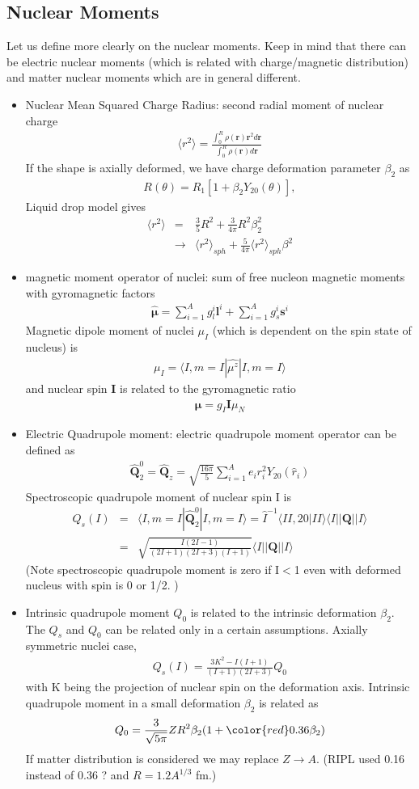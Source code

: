 \documentclass[11pt]{book}
\def\bm{\boldsymbol}
\def\vr{{\bm r}}
\def\la{\langle}
\def\ra{\rangle}
\newcommand{\bea}{\begin{eqnarray}}
\newcommand{\eea}{\end{eqnarray}}
\newcommand{\no}{\nonumber \\}
\begin{document}
\subsection{Nuclear Moments}
Let us define more clearly on the nuclear moments. 
Keep in mind that there can be electric nuclear moments
(which is related with charge/magnetic distribution)
and matter nuclear moments which are in general different. 
\begin{itemize}
\item Nuclear Mean Squared Charge Radius: second radial moment
     of nuclear charge
     \bea 
     \la r^2\ra =\frac{\int_0^R \rho(\vr)\vr^2 d\vr}{\int_0^R \rho(\vr)d\vr}
     \eea
     If the shape is axially deformed, we have charge deformation 
     parameter $\beta_2$ as
     \bea 
     R(\theta)=R_1[1+\beta_2 Y_{20}(\theta)],
     \eea  
     Liquid drop model gives
     \bea
     \la r^2\ra &=& \frac{3}{5}R^2+\frac{3}{4\pi}R^2\beta^2_2 \no 
                &\to& \la r^2\ra_{sph}
                     +\frac{5}{4\pi}\la r^2\ra_{sph} \beta^2 
     \eea 
\item magnetic moment operator of nuclei: sum of free nucleon
      magnetic moments with gyromagnetic factors
     \bea 
     \hat{\bm \mu}=\sum_{i=1}^A g_l^i {\bm l}^i
                  +\sum_{i=1}^A g_s^i {\bm s}^i
     \eea
     Magnetic dipole moment of nuclei $\mu_I$ (which is dependent on the spin state of nucleus)
     is 
     \bea 
     \mu_I=\la I,m=I|\hat{\mu^z}|I,m=I\ra 
     \eea      
     and nuclear spin ${\bm I}$ is related to the gyromagnetic ratio
     \bea
     {\bm \mu}=g_I {\bm I} \mu_N 
     \eea 
\item Electric Quadrupole moment: 
      electric quadrupole moment operator can be defined as
      \bea 
      \hat{\bm Q}_2^0=\hat{\bm Q}_z=\sqrt{\frac{16\pi}{5}}\sum_{i=1}^A
                       e_i r_i^2 Y_{20}(\hat{r}_i) 
      \eea      
      Spectroscopic quadrupole moment of nuclear spin I is
      \bea 
      Q_s(I)&=&\la I,m=I|\hat{\bm Q}_2^0|I,m=I\ra 
              =\hat{I}^{-1}\la II,20|II\ra \la I || {\bm Q} || I\ra \no  
            &=&\sqrt{\frac{I(2I-1)}{(2I+1)(2I+3)(I+1)}}
             \la I || {\bm Q} || I\ra 
      \eea 
      (Note spectroscopic quadrupole moment is zero if I$<$1
      even with deformed nucleus with spin is 0 or 1/2.
      )
      
      
\item Intrinsic quadrupole moment $Q_0$ is related to the intrinsic 
      deformation $\beta_2$. The $Q_s$ and $Q_0$ can be related 
      only in a certain assumptions. Axially symmetric nuclei case,
      \bea 
      Q_s(I)=\frac{3K^2-I(I+1)}{(I+1)(2I+3)} Q_0
      \eea 
      with K being the projection of nuclear spin on the 
      deformation axis. 
      Intrinsic quadrupole moment in a small deformation $\beta_2$
      is related as
      \bea 
      Q_0=\frac{3}{\sqrt{5\pi}}ZR^2\beta_2(1+{\color{red}0.36}\beta_2)
      \eea 
      If matter distribution is considered we may replace $Z\to A$.
      (RIPL used 0.16 instead of 0.36 ? and $R=1.2A^{1/3}$ fm.)
\end{itemize}
 
\end{document}
